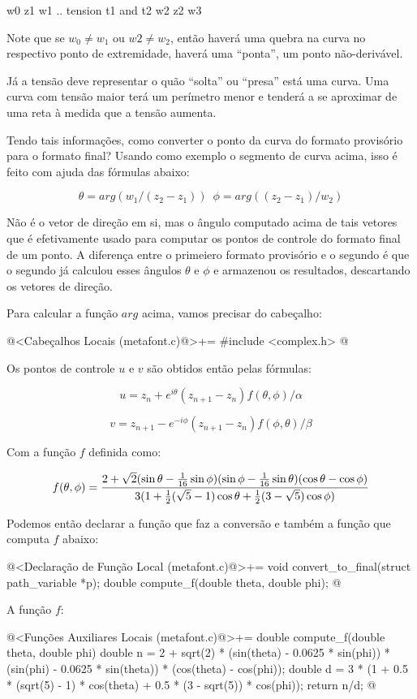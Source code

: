 \alinhaverbatim
{w0} z1 {w1} .. tension t1 and t2 {w2} z2 {w3} 
\alinhanormal

Note que se $w_0\neq w_1$ ou $w2 \neq w_2$, então haverá uma quebra na
curva no respectivo ponto de extremidade, haverá uma ``ponta'', um
ponto não-derivável.

Já a tensão deve representar o quão ``solta'' ou ``presa'' está uma
curva. Uma curva com tensão maior terá um perímetro menor e tenderá a
se aproximar de uma reta à medida que a tensão aumenta.

Tendo tais informações, como converter o ponto da curva do formato
provisório para o formato final? Usando como exemplo o segmento de
curva acima, isso é feito com ajuda das fórmulas abaixo:

$$
\theta = arg(w_1/(z_2-z_1))\,\,\,\phi = arg((z_2-z_1)/w_2)
$$

Não é o vetor de direção em si, mas o ângulo computado acima de tais
vetores que é efetivamente usado para computar os pontos de controle
do formato final de um ponto. A diferença entre o primeiero formato
provisório e o segundo é que o segundo já calculou esses ângulos
$\theta$ e $\phi$ e armazenou os resultados, descartando os vetores de
direção.

Para calcular a função $arg$ acima, vamos precisar do cabeçalho:

\iniciocodigo
@<Cabeçalhos Locais (metafont.c)@>+=
#include <complex.h>
@
\fimcodigo

Os pontos de controle $u$ e $v$ são obtidos então pelas fórmulas:

$$
u = z_{n} + e^{i\theta}(z_{n+1}-z_n)f(\theta, \phi)/\alpha
$$

$$
v = z_{n+1} - e^{-i\phi}(z_{n+1}-z_n)f(\phi, \theta)/\beta
$$

Com a função $f$ definida como:

$$
f(\theta, \phi) = {{2+\sqrt{2}(\sin\theta-{{1}\over{16}}\sin\phi)(\sin\phi-{{1}\over{16}}\sin\theta)(\cos\theta-\cos\phi)}\over{3(1+{1\over 2}(\sqrt 5 - 1)\cos\theta+{1\over 2}(3-\sqrt 5)\cos\phi)}}
$$

Podemos então declarar a função que faz a conversão e também a função
que computa $f$ abaixo:

\iniciocodigo
@<Declaração de Função Local (metafont.c)@>+=
void convert_to_final(struct path_variable *p);
double compute_f(double theta, double phi);
@
\fimcodigo

A função $f$:

\iniciocodigo
@<Funções Auxiliares Locais (metafont.c)@>+=
double compute_f(double theta, double phi){
  double n = 2 + sqrt(2) * (sin(theta) - 0.0625 * sin(phi)) *
             (sin(phi) - 0.0625 * sin(theta)) * (cos(theta) - cos(phi));
  double d = 3 * (1 + 0.5 * (sqrt(5) - 1) * cos(theta) + 0.5 * (3 - sqrt(5)) *
                  cos(phi));
  return n/d;
}
@
\fimcodigo

